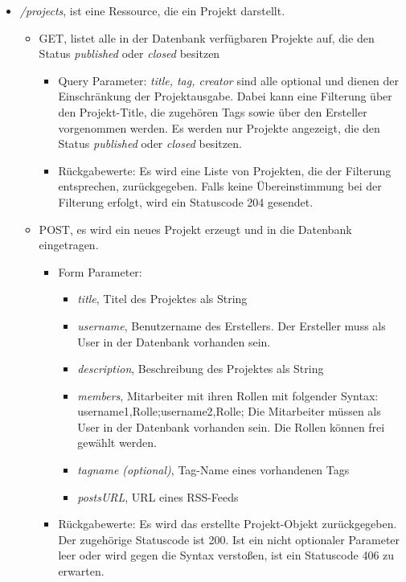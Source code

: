 \documentclass[12pt]{scrartcl}
\begin{document}
	\begin{itemize}
			\item \emph{/projects}, ist eine Ressource, die ein Projekt darstellt. 
			\begin{itemize}
				\item GET, listet alle in der Datenbank verfügbaren Projekte auf, die den Status \emph{published} oder \emph{closed} besitzen
				\begin{itemize}
					\item Query Parameter: \emph{title, tag, creator} sind alle optional und dienen der Einschränkung der Projektausgabe. Dabei kann eine Filterung über den Projekt-Title, die zugehören Tags sowie über den Ersteller vorgenommen werden. Es werden nur Projekte angezeigt, die den Status \emph{published} oder \emph{closed} besitzen.
					\item Rückgabewerte: Es wird eine Liste von Projekten, die der Filterung entsprechen, zurückgegeben. Falls keine Übereinstimmung bei der Filterung erfolgt, wird ein Statuscode 204 gesendet. 
				\end{itemize}
				\item POST, es wird ein neues Projekt erzeugt und in die Datenbank eingetragen.
				\begin{itemize}
					\item Form Parameter:
					\begin{itemize}
						\item  \emph{title}, Titel des Projektes als String
						\item  \emph{username}, Benutzername des Erstellers. Der Ersteller muss als User in der Datenbank vorhanden sein.
						\item  \emph{description}, Beschreibung des Projektes als String
						\item  \emph{members}, Mitarbeiter mit ihren Rollen mit folgender Syntax: username1,Rolle;username2,Rolle; Die Mitarbeiter müssen als User in der Datenbank vorhanden sein. Die Rollen können frei gewählt werden.
						\item  \emph{tagname (optional)}, Tag-Name eines vorhandenen Tags
						\item \emph{postsURL}, URL eines RSS-Feeds 
					\end{itemize}
					\item Rückgabewerte: Es wird das erstellte Projekt-Objekt zurückgegeben. Der zugehörige Statuscode ist 200. Ist ein nicht optionaler Parameter leer oder wird gegen die Syntax verstoßen, ist ein Statuscode 406 zu erwarten.  
				\end{itemize}

\end{itemize}
\end{itemize}
\end{document}
